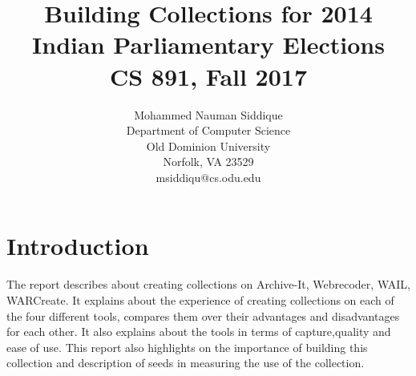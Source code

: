 \documentclass[11pt,journal,compsoc,onecolumn]{IEEEtran}
\begin{document}
%
\title{Building Collections for 2014 Indian Parliamentary Elections\\
CS 891, Fall 2017}

\author{Mohammed Nauman Siddique\\
Department of Computer Science\\
Old Dominion University\\
Norfolk, VA 23529\\
msiddiqu@cs.odu.edu
}


\maketitle

\section{Introduction}
The report describes about creating collections on Archive-It, Webrecoder, WAIL, WARCreate. It explains about the experience of creating collections on each of the four different tools, compares them over their advantages and disadvantages for each other. It also explains about the tools in terms of capture,quality and ease of use. This report also highlights on the importance of building this collection and description of seeds in measuring the use of the collection.  
\end{document}
